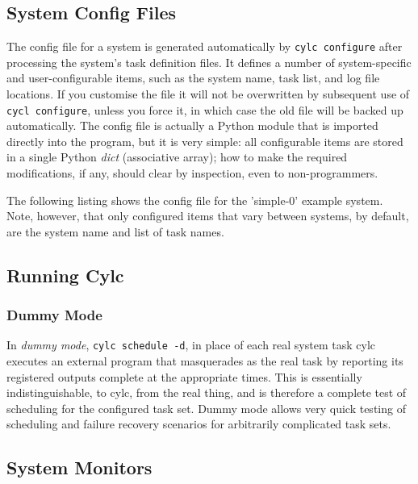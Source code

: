 \documentclass[11pt,a4paper]{article}
\begin{document}
\pagebreak
\subsection{System Config Files}

The config file for a system is generated automatically by 
\lstinline=cylc configure= 
after processing the system's task definition files. It
defines a number of system-specific and user-configurable items, such as
the system name, task list, and log file locations.  If you customise
the file it will not be overwritten by subsequent use of 
\lstinline=cycl configure=, 
unless you force it, in which case the old file will be
backed up automatically. The config file is actually a Python module
that is imported directly into the program, but it is very simple: all
configurable items are stored in a single Python {\em dict} (associative
array); how to make the required modifications, if any, should clear by
inspection, even to non-programmers.

The following listing shows the config file for the 'simple-0' example
system. Note, however, that only configured items that vary between
systems, by default, are the system name and list of task names. 
\lstset{ language=Python }
{

}

\lstset{language=}

\pagebreak
\subsection{Running Cylc}

\label{sec:dummymode}
\subsubsection{Dummy Mode}

In {\em dummy mode}, \lstinline=cylc schedule -d=, in place of each real
system task cylc executes an external program that masquerades as the
real task by reporting its registered outputs complete at the appropriate
times. This is essentially indistinguishable, to cylc, from the real
thing, and is therefore a complete test of scheduling for the configured
task set. Dummy mode allows very quick testing of scheduling and failure
recovery scenarios for arbitrarily complicated task sets.


\subsection{System Monitors}
\end{document}
